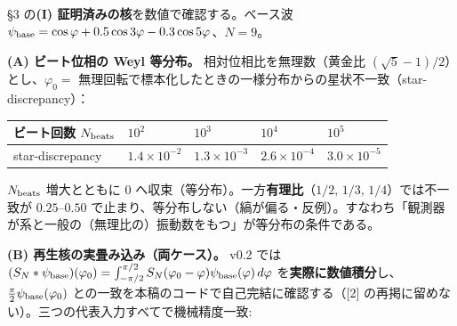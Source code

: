 \documentclass[
]{ltjsarticle}
\newcounter{none} %
\begin{document}
§3 の\textbf{(I) 証明済みの核}を数値で確認する。ベース波
\(\psi_{\rm base}=\cos\varphi+0.5\cos3\varphi-0.3\cos5\varphi\)、\(N=9\)。

\textbf{(A) ビート位相の Weyl 等分布。} 相対位相比を無理数（黄金比
\((\sqrt5-1)/2\)）とし、\(\varphi_0=\)
無理回転で標本化したときの一様分布からの星状不一致（star-discrepancy）：

{\def\LTcaptype{none} %
\begin{longtable}[]{@{}
  >{\raggedright\arraybackslash}p{}
  >{\raggedright\arraybackslash}p{}
  >{\raggedright\arraybackslash}p{}
  >{\raggedright\arraybackslash}p{}
  >{\raggedright\arraybackslash}p{}@{}}
\toprule\noalign{}
\begin{minipage}[b]{\linewidth}\raggedright
ビート回数 \(N_{\rm beats}\)
\end{minipage} & \begin{minipage}[b]{\linewidth}\raggedright
\(10^2\)
\end{minipage} & \begin{minipage}[b]{\linewidth}\raggedright
\(10^3\)
\end{minipage} & \begin{minipage}[b]{\linewidth}\raggedright
\(10^4\)
\end{minipage} & \begin{minipage}[b]{\linewidth}\raggedright
\(10^5\)
\end{minipage} \\
\midrule\noalign{}
\endhead
\bottomrule\noalign{}
\endlastfoot
star-discrepancy & \(1.4\times10^{-2}\) & \(1.3\times10^{-3}\) &
\(2.6\times10^{-4}\) & \(3.0\times10^{-5}\) \\
\end{longtable}
}

\(N_{\rm beats}\) 増大とともに \(0\)
へ収束（等分布）。一方\textbf{有理比}（\(1/2,\,1/3,\,1/4\)）では不一致が
\(0.25\)--\(0.50\)
で止まり、等分布しない（縞が偏る・反例）。すなわち「観測器が系と一般の（無理比の）振動数をもつ」が等分布の条件である。

\textbf{(B) 再生核の実畳み込み（両ケース）。} v0.2 では
\((S_N*\psi_{\rm base})(\varphi_0)=\int_{-\pi/2}^{\pi/2}S_N(\varphi_0-\varphi)\psi_{\rm base}(\varphi)\,d\varphi\)
を\textbf{実際に数値積分}し、\(\tfrac{\pi}{2}\psi_{\rm base}(\varphi_0)\)
との一致を本稿のコードで自己完結に確認する（{[}2{]}
の再掲に留めない）。三つの代表入力すべてで機械精度一致:
\end{document}
